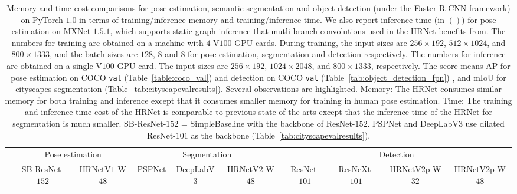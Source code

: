 \documentclass[10pt,journal,compsoc]{IEEEtran}
\begin{document}
\begin{table}[t]

    \centering\setlength{\tabcolsep}{2.0pt}
    \scriptsize
    \caption{
    Memory and time cost comparisons
    for pose estimation, semantic segmentation and object detection (under the Faster R-CNN framework) on PyTorch $1.0$
    in terms of training/inference memory and training/inference time. 
    We also report inference time (in $()$) for pose estimation on MXNet $1.5.1$,
    which supports static graph inference
    that mutli-branch convolutions used in 
    the HRNet benefits from.
    The numbers for training are obtained
    on a machine with $4$ V$100$ GPU cards.
    During training,
    the input sizes are $256\times192$, $512\times1024$, and $800\times1333$,
    and the batch sizes
    are $128$, $8$ and $8$ for pose estimation, segmentation and detection respectively.
    The numbers for inference
    are obtained on a single V$100$ GPU card.
    The input sizes are $256\times192$, $1024\times2048$, and $800\times1333$, respectively.
   The score means AP for pose estimation 
   on COCO \texttt{val} (Table~\ref{table:coco_val})
   and detection on COCO \texttt{val}
   (Table~\ref{tab:object_detection_fpn})
   , and mIoU for cityscapes segmentation
   (Table~\ref{tab:cityscapevalresults}). 
    Several observations are highlighted.
    Memory: 
    The HRNet consumes similar memory for both training and inference
    except that it consumes smaller memory for training in human pose estimation.
    Time: The training and inference time cost of the HRNet
    is comparable to previous state-of-the-arts
    except that the inference time of the HRNet for segmentation is much smaller.
   SB-ResNet-$152$ = SimpleBaseline with the backbone of ResNet-$152$.
   PSPNet and DeepLabV3 use dilated ResNet-$101$
   as the backbone (Table~\ref{tab:cityscapevalresults}).}
   \vspace{-2mm}
    \label{tab:memorytime}
    \begin{tabular}{l|cc|ccc|cccc}
        \hline %
		\multirow{2}{*}{} & \multicolumn{2}{c|}{Pose estimation}  & \multicolumn{3}{c|}{Segmentation} & \multicolumn{4}{c}{Detection} \\
		\cline{2-10}
		& SB-ResNet-$152$ & HRNetV$1$-W$48$ & PSPNet & DeepLabV$3$& HRNetV$2$-W$48$ & ResNet-$101$ & ResNeXt-$101$ & HRNetV$2$p-W$32$ & HRNetV$2$p-W$48$ \\
		\hline
        

\end{tabular}
\end{table}
\end{document}
